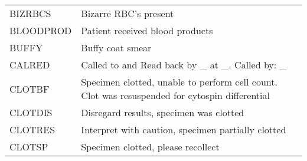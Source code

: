 \begin{fullwidth}
\begin{longtable}{p{.20\linewidth} p{.75\linewidth}}
BIZRBCS     & Bizarre RBC's present                                                                                                                                                                                                                                                                        \\
BLOODPROD   & Patient received blood products                                                                                                                                                                                                                                                              \\
BUFFY       & Buffy coat smear                                                                                                                                                                                                                                                                             \\
CALRED      & Called to and Read back by \_ at \_. Called by: \_                                                                                                                                                                                                                                              \\
CLOTBF      & Specimen clotted, unable to perform cell count. Clot was resuspended for cytospin differential                                                                                                                                                                                               \\
CLOTDIS     & Disregard results, specimen was clotted                                                                                                                                                                                                                                                      \\
CLOTRES     & Interpret with caution, specimen partially clotted                                                                                                                                                                                                                                           \\
CLOTSP      & Specimen clotted, please recollect                                                                                                                                                                                                                                                           \\

\end{longtable}
\end{fullwidth}
